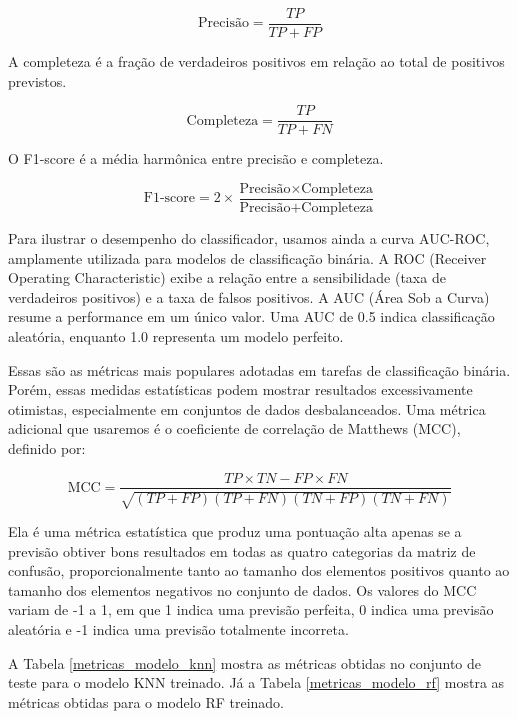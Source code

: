 \begin{equation}
    \text{Precisão} = \frac{TP}{TP + FP}
    \label{eq:precisao}
\end{equation}

A completeza é a fração de verdadeiros positivos em relação ao total de positivos previstos.

\begin{equation}
    \text{Completeza} = \frac{TP}{TP + FN}
    \label{eq:completeza}
\end{equation}

O F1-score é a média harmônica entre precisão e completeza.

\begin{equation}
    \text{F1-score} = 2 \times \frac{\text{Precisão} \times \text{Completeza}}{\text{Precisão} + \text{Completeza}}
\end{equation}

Para ilustrar o desempenho do classificador, usamos ainda a curva AUC-ROC, amplamente utilizada para modelos de classificação binária. A ROC (Receiver Operating Characteristic) exibe a relação entre a sensibilidade (taxa de verdadeiros positivos) e a taxa de falsos positivos. A AUC (Área Sob a Curva) resume a performance em um único valor. Uma AUC de 0.5 indica classificação aleatória, enquanto 1.0 representa um modelo perfeito.

Essas são as métricas mais populares adotadas em tarefas de classificação binária. Porém, essas medidas estatísticas podem mostrar resultados excessivamente otimistas, especialmente em conjuntos de dados desbalanceados. Uma métrica adicional que usaremos é o coeficiente de correlação de Matthews (MCC), definido por:

\begin{equation}
    \text{MCC} = \frac{TP \times TN - FP \times FN}{\sqrt{(TP + FP)(TP + FN)(TN + FP)(TN + FN)}}
\end{equation}

Ela é uma métrica estatística que produz uma pontuação alta apenas se a previsão obtiver bons resultados em todas as quatro categorias da matriz de confusão, proporcionalmente tanto ao tamanho dos elementos positivos quanto ao tamanho dos elementos negativos no conjunto de dados. Os valores do MCC variam de -1 a 1, em que 1 indica uma previsão perfeita, 0 indica uma previsão aleatória e -1 indica uma previsão totalmente incorreta.

A Tabela \ref{metricas_modelo_knn} mostra as métricas obtidas no conjunto de teste para o modelo KNN treinado. Já a Tabela \ref{metricas_modelo_rf} mostra as métricas obtidas para o modelo RF treinado.

